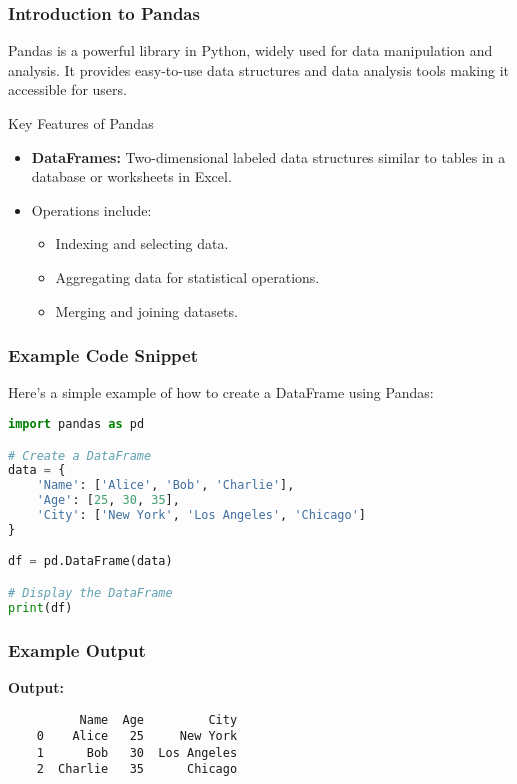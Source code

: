 \documentclass[aspectratio=169]{beamer}
\begin{document}
\begin{frame}
    \frametitle{Introduction to Pandas}

    Pandas is a powerful library in Python, widely used for data manipulation and analysis. It provides easy-to-use data structures and data analysis tools making it accessible for users.

    \begin{block}{Key Features of Pandas}
        \begin{itemize}
            \item \textbf{DataFrames:} Two-dimensional labeled data structures similar to tables in a database or worksheets in Excel.
            \item Operations include:
                \begin{itemize}
                    \item Indexing and selecting data.
                    \item Aggregating data for statistical operations.
                    \item Merging and joining datasets.
                \end{itemize}
        \end{itemize}
    \end{block}
\end{frame}

\begin{frame}[fragile]
    \frametitle{Example Code Snippet}

    Here's a simple example of how to create a DataFrame using Pandas:
    
    \begin{lstlisting}[language=Python]
import pandas as pd

# Create a DataFrame
data = {
    'Name': ['Alice', 'Bob', 'Charlie'],
    'Age': [25, 30, 35],
    'City': ['New York', 'Los Angeles', 'Chicago']
}

df = pd.DataFrame(data)

# Display the DataFrame
print(df)
    \end{lstlisting}
\end{frame}

\begin{frame}
    \frametitle{Example Output}

    \textbf{Output:}
    \begin{verbatim}
          Name  Age         City
    0    Alice   25     New York
    1      Bob   30  Los Angeles
    2  Charlie   35      Chicago
    \end{verbatim}
\end{frame}
\end{document}
